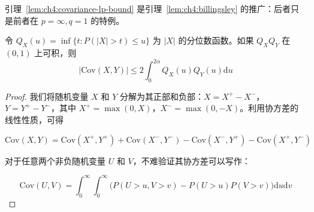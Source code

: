 引理~\ref{lem:ch4:covariance-lp-bound} 是引理~\ref{lem:ch4:billingsley} 的推广：后者只是前者在 $p=\infty,q=1$ 的特例。

\begin{lemma}\label{lem:ch4:rio}

令 $Q_{X}(u) = \inf \{t: P(|X| > t) \leq u\}$ 为 $|X|$ 的分位数函数。如果 $Q_{X}Q_{Y}$ 在 $(0,1)$ 上可积，则
\[|\mathrm {Cov}(X,Y)|\leq 2\int_{0}^{2\alpha}Q_{X}(u)Q_{Y}(u)\mathrm{d}u\]
\end{lemma}

\begin{proof}

我们将随机变量 $X$ 和 $Y$ 分解为其正部和负部：$X = X^{+} - X^{-}$，$Y = Y^{+} - Y^{-}$，其中 $X^{+} = \max(0, X)$，$X^{-} = \max(0, -X)$。利用协方差的线性性质，可得

\begin{equation}
\label{eq:ch4:tag-6}
\mathrm{Cov}(X,Y) = \mathrm{Cov}(X^{+},Y^{+}) + \mathrm{Cov}(X^{-},Y^{-}) - \mathrm{Cov}(X^{-},Y^{+}) - \mathrm{Cov}(X^{+},Y^{-})
\end{equation}

对于任意两个非负随机变量 $U$ 和 $V$，不难验证其协方差可以写作：

\begin{equation}
\label{eq:ch4:tag-7}
\mathrm{Cov}(U,V) = \int_{0}^{\infty} \!\!\int_{0}^{\infty} \Big( P(U > u, V > v) - P(U > u)P(V > v) \Big)\mathrm{d}u \mathrm{d}v
\end{equation}


\end{proof}
